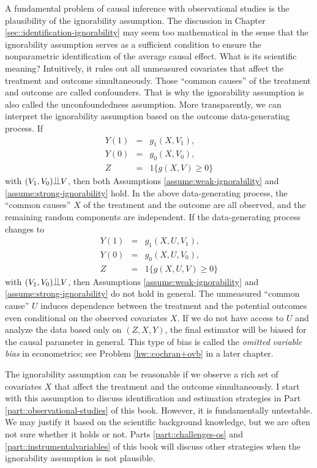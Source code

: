 A fundamental problem of causal inference with observational studies is the plausibility of the ignorability assumption. The discussion in Chapter \ref{sec::identification-ignorability} may seem too mathematical in the sense that the ignorability assumption serves as a sufficient condition to ensure the nonparametric identification of the average causal effect. What is its scientific meaning? Intuitively, it rules out all unmeasured covariates that affect the treatment and outcome simultaneously. Those ``common causes'' of the treatment and outcome are called confounders. That is why the ignorability assumption is also called the unconfoundedness assumption. More transparently, we can interpret the ignorability assumption based on the outcome data-generating process. If
\begin{eqnarray*}
Y(1) &=& g_1(X, V_1),\\
Y(0) &=& g_0(X, V_0), \\
Z &=& 1\{ g(X,V)  \geq 0 \}
\end{eqnarray*} 
with $(V_1, V_0)\ind V$, then both Assumptions \ref{assume:weak-ignorability} and \ref{assume:strong-ignorability} hold. In the above data-generating process, the ``common causes'' $X$ of the treatment and the outcome are all observed, and the remaining random components are independent. If the data-generating process changes to
\begin{eqnarray*}
Y(1) &=& g_1(X, U, V_1),\\
Y(0) &=& g_0(X, U, V_0), \\
Z &=& 1\{ g(X, U, V)  \geq 0 \}
\end{eqnarray*} 
with $(V_1, V_0)\ind V$, then Assumptions \ref{assume:weak-ignorability} and \ref{assume:strong-ignorability} do not hold in general. The unmeasured ``common cause'' $U$ induces dependence between the treatment and the potential outcomes even conditional on the observed covariates $X$. If we do not have access to $U$ and analyze the data based only on $(Z,X,Y)$, the final estimator will be biased for the causal parameter in general. This type of bias is called the {\it omitted variable bias} in econometrics; see Problem \ref{hw::cochran+ovb} in a later chapter. 



The ignorability assumption can be reasonable if we observe a rich set of covariates $X$ that affect the treatment and the outcome simultaneously. I start with this assumption to discuss identification and estimation strategies in Part \ref{part::observational-studies} of this book. However, it is fundamentally untestable. We may justify it based on the scientific background knowledge, but we are often not sure whether it holds or not. Parts \ref{part::challenges-os} and \ref{part::instrumentalvariables} of this book will discuss other strategies when the ignorability assumption is not plausible. 




